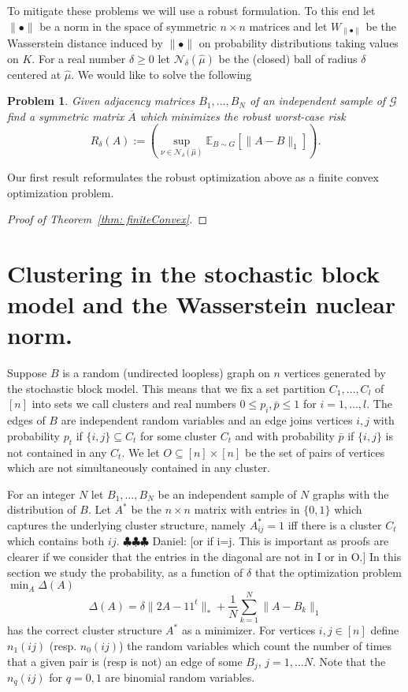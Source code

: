 \documentclass[12pt]{amsart}
\newtheorem*{problem*}{Problem}
\theoremstyle{remark}
\newcommand{\EE}{\mathbb{E}}
\newcommand{\grG}{{\mathcal{G}}}
\newcommand{\ddr}[1]{{\color{blue} \sf $\clubsuit\clubsuit\clubsuit$ Daniel: [#1]}}
\begin{document}
To mitigate these problems we will use a robust formulation. To this end let $\|\bullet\|$ be a norm in the space of symmetric $n\times n$ matrices and let $W_{\|\bullet\|}$ be the Wasserstein distance induced by $\|\bullet\|$ on probability distributions taking values on $K$. For a real number $\delta\geq 0$ let $\mathcal{N}_{\delta}(\hat{\mu})$ be the (closed) ball of radius $\delta$ centered at $\hat{\mu}$. We would like to solve the following


\begin{problem*}\label{ProbRobusto} Given adjacency matrices $B_1,\dots, B_N$ of an independent sample of $\grG$ find a symmetric matrix $\overline{A}$ which minimizes the robust worst-case risk 
\[R_{\delta}(A):=\left(\sup_{\nu\in \mathcal{N}_{\delta}(\hat{\mu})} \EE_{B\sim G}[\|A-B\|_1]\right).\] 
\end{problem*}

Our first result reformulates the robust optimization above as a finite convex optimization problem.
\begin{proof}[Proof of Theorem~\ref{thm: finiteConvex}]
\end{proof}


\section{Clustering in the stochastic block model and the Wasserstein nuclear norm.}

Suppose $B$ is a random (undirected loopless) graph on $n$ vertices generated by the stochastic block model. This means that we fix a set partition $C_1,\dots, C_l$ of $[n]$ into sets we call clusters and real numbers $0\leq p_i,\bar{p}\leq 1$ for $i=1,\dots, l$. The edges of $B$ are independent random variables and an edge joins vertices $i,j$ with probability $p_t$ if $\{i,j\}\subseteq C_t$ for some cluster $C_t$ and with probability $\bar{p}$ if $\{i,j\}$ is not contained in any $C_t$. We let $O\subseteq [n]\times [n]$ be the set of pairs of vertices which are not simultaneously contained in any cluster. 

For an integer $N$ let $B_1,\dots, B_N$ be an independent sample of $N$ graphs with the distribution of $B$. Let $A^*$ be the $n\times n$ matrix with entries in $\{0,1\}$ which captures the underlying cluster structure, namely $A^*_{ij}=1$ iff there is a cluster $C_t$ which contains both $ij$.
\ddr{or if i=j. This is important as proofs are clearer if we consider that the entries in the diagonal are not in I or in O.}
In this section we study the probability, as a function of $\delta$ that the optimization problem $\min_A\Delta(A)$
\[\Delta(A)= \delta\|2A-11^t\|_{*}+\frac{1}{N}\sum_{k=1}^N\|A-B_k\|_1\] 
has the correct cluster structure $A^*$ as a minimizer. For vertices $i,j\in [n]$ define $n_1(ij)$ (resp. $n_0(ij)$) the random variables which count the number of times that a given pair is (resp is not) an edge of some $B_j$, $j=1,\dots N$. Note that the $n_q(ij)$ for $q=0,1$ are binomial random variables.  
\end{document}
